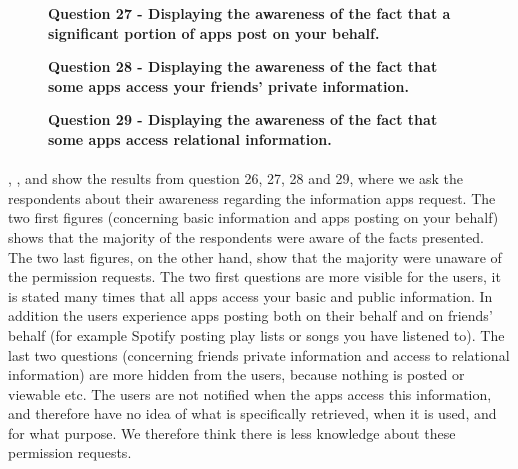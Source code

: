 \begin{figure}[h!]
\centering
{}
\caption[Question 27 - Displaying the awareness of the fact that a significant portion of apps post on your behalf]{\textbf{Question 27 - Displaying the awareness of the fact that a significant portion of apps post on your behalf.}} 
\label{fig:appspostonyourbehalf}
\end{figure}

\begin{figure}[h!]
\centering
{}
\caption[Question 28 - Displaying the awareness of the fact that some apps access your friends' private information]{\textbf{Question 28 - Displaying the awareness of the fact that some apps access your friends' private information.}} 
\label{fig:appsaccesstofriendsinfo}
\end{figure}

\begin{figure}[h!]
\centering
{}
\caption[Question 29 - Displaying the awareness of the fact that some apps access relational information]{\textbf{Question 29 - Displaying the awareness of the fact that some apps access relational information.}} 
\label{fig:appsaccessrelationalinfo}
\end{figure}

\paragraph{}
, ,  and  show the results from question 26, 27, 28 and 29, where we ask the respondents about their awareness regarding the information apps request. The two first figures (concerning basic information and apps posting on your behalf) shows that the majority of the respondents were aware of the facts presented. The two last figures, on the other hand, show that the majority were unaware of the permission requests. The two first questions are more visible for the users, it is stated many times that all apps access your basic and public information. In addition the users experience apps posting both on their behalf and on friends' behalf (for example Spotify posting play lists or songs you have listened to). The last two questions (concerning friends private information and access to relational information) are more hidden from the users, because nothing is posted or viewable etc. The users are not notified when the apps access this information, and therefore have no idea of what is specifically retrieved, when it is used, and for what purpose. We therefore think there is less knowledge about these permission requests. 

